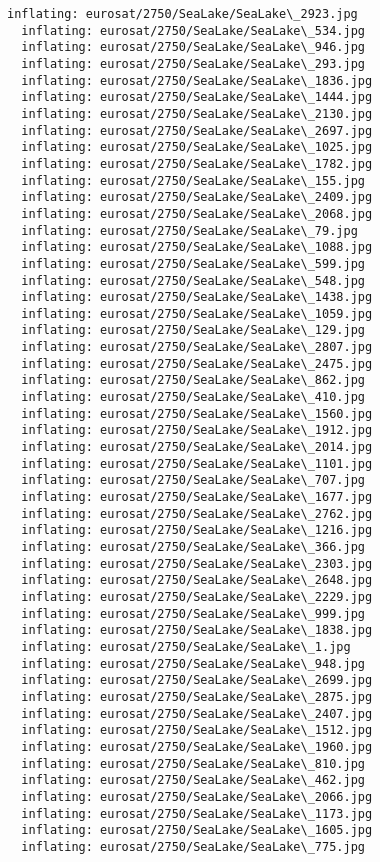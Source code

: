 \documentclass[11pt]{article}
\begin{document}
\begin{Verbatim}[commandchars=\\\{\}]
  inflating: eurosat/2750/SeaLake/SeaLake\_2923.jpg
  inflating: eurosat/2750/SeaLake/SeaLake\_534.jpg
  inflating: eurosat/2750/SeaLake/SeaLake\_946.jpg
  inflating: eurosat/2750/SeaLake/SeaLake\_293.jpg
  inflating: eurosat/2750/SeaLake/SeaLake\_1836.jpg
  inflating: eurosat/2750/SeaLake/SeaLake\_1444.jpg
  inflating: eurosat/2750/SeaLake/SeaLake\_2130.jpg
  inflating: eurosat/2750/SeaLake/SeaLake\_2697.jpg
  inflating: eurosat/2750/SeaLake/SeaLake\_1025.jpg
  inflating: eurosat/2750/SeaLake/SeaLake\_1782.jpg
  inflating: eurosat/2750/SeaLake/SeaLake\_155.jpg
  inflating: eurosat/2750/SeaLake/SeaLake\_2409.jpg
  inflating: eurosat/2750/SeaLake/SeaLake\_2068.jpg
  inflating: eurosat/2750/SeaLake/SeaLake\_79.jpg
  inflating: eurosat/2750/SeaLake/SeaLake\_1088.jpg
  inflating: eurosat/2750/SeaLake/SeaLake\_599.jpg
  inflating: eurosat/2750/SeaLake/SeaLake\_548.jpg
  inflating: eurosat/2750/SeaLake/SeaLake\_1438.jpg
  inflating: eurosat/2750/SeaLake/SeaLake\_1059.jpg
  inflating: eurosat/2750/SeaLake/SeaLake\_129.jpg
  inflating: eurosat/2750/SeaLake/SeaLake\_2807.jpg
  inflating: eurosat/2750/SeaLake/SeaLake\_2475.jpg
  inflating: eurosat/2750/SeaLake/SeaLake\_862.jpg
  inflating: eurosat/2750/SeaLake/SeaLake\_410.jpg
  inflating: eurosat/2750/SeaLake/SeaLake\_1560.jpg
  inflating: eurosat/2750/SeaLake/SeaLake\_1912.jpg
  inflating: eurosat/2750/SeaLake/SeaLake\_2014.jpg
  inflating: eurosat/2750/SeaLake/SeaLake\_1101.jpg
  inflating: eurosat/2750/SeaLake/SeaLake\_707.jpg
  inflating: eurosat/2750/SeaLake/SeaLake\_1677.jpg
  inflating: eurosat/2750/SeaLake/SeaLake\_2762.jpg
  inflating: eurosat/2750/SeaLake/SeaLake\_1216.jpg
  inflating: eurosat/2750/SeaLake/SeaLake\_366.jpg
  inflating: eurosat/2750/SeaLake/SeaLake\_2303.jpg
  inflating: eurosat/2750/SeaLake/SeaLake\_2648.jpg
  inflating: eurosat/2750/SeaLake/SeaLake\_2229.jpg
  inflating: eurosat/2750/SeaLake/SeaLake\_999.jpg
  inflating: eurosat/2750/SeaLake/SeaLake\_1838.jpg
  inflating: eurosat/2750/SeaLake/SeaLake\_1.jpg
  inflating: eurosat/2750/SeaLake/SeaLake\_948.jpg
  inflating: eurosat/2750/SeaLake/SeaLake\_2699.jpg
  inflating: eurosat/2750/SeaLake/SeaLake\_2875.jpg
  inflating: eurosat/2750/SeaLake/SeaLake\_2407.jpg
  inflating: eurosat/2750/SeaLake/SeaLake\_1512.jpg
  inflating: eurosat/2750/SeaLake/SeaLake\_1960.jpg
  inflating: eurosat/2750/SeaLake/SeaLake\_810.jpg
  inflating: eurosat/2750/SeaLake/SeaLake\_462.jpg
  inflating: eurosat/2750/SeaLake/SeaLake\_2066.jpg
  inflating: eurosat/2750/SeaLake/SeaLake\_1173.jpg
  inflating: eurosat/2750/SeaLake/SeaLake\_1605.jpg
  inflating: eurosat/2750/SeaLake/SeaLake\_775.jpg

\end{Verbatim}
\end{document}
